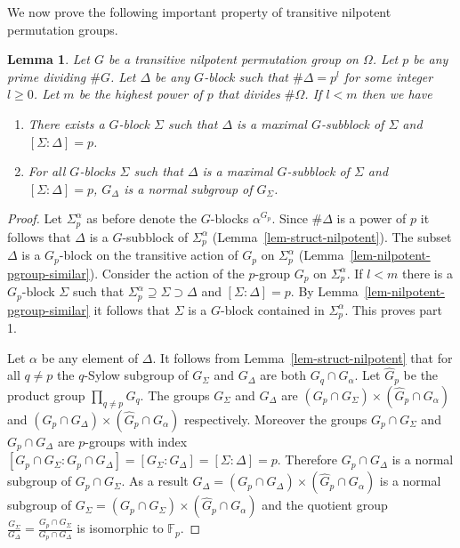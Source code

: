 \documentclass[11pt]{madras}%
\newtheorem{lemma}[theorem]{Lemma}
\theoremstyle{remark}
\begin{document}
 We now prove the following important property of transitive nilpotent
 permutation groups.

\begin{lemma}\label{lem-nilpotent-block-increment}
  Let $G$ be a transitive nilpotent permutation group on $\Omega$. Let
  $p$ be any prime dividing $\# G$. Let $\Delta$ be any $G$-block such
  that $\# \Delta = p^l$ for some integer $l \geq 0$. Let $m$ be the
  highest power of $p$ that divides $\# \Omega$. If $l < m$ then we
  have
  \begin{enumerate}
  \item There exists a $G$-block $\Sigma$ such that $\Delta$ is a
    maximal $G$-subblock of $\Sigma$ and $[\Sigma: \Delta] = p$.
  \item For all $G$-blocks $\Sigma$ such that $\Delta$ is a maximal
    $G$-subblock of $\Sigma$ and $[\Sigma: \Delta] = p$, $G_\Delta$ is
    a normal subgroup of $G_\Sigma$.
  \end{enumerate}
\end{lemma}
\begin{proof}
  Let $\Sigma_p^\alpha$ as before denote the $G$-blocks
  $\alpha^{G_p}$.  Since $\# \Delta$ is a power of $p$ it follows that
  $\Delta$ is a $G$-subblock of $\Sigma_p^\alpha$
  (Lemma~\ref{lem-struct-nilpotent}). The subset $\Delta$ is a
  $G_p$-block on the transitive action of $G_p$ on $\Sigma_p^\alpha$
  (Lemma~\ref{lem-nilpotent-pgroup-similar}).  Consider the action of
  the $p$-group $G_p$ on $\Sigma_p^\alpha$. If $l < m$ there is a
  $G_p$-block $\Sigma$ such that $\Sigma_p^\alpha \supseteq \Sigma
  \supset \Delta$ and $[\Sigma : \Delta] = p$. By
  Lemma~\ref{lem-nilpotent-pgroup-similar} it follows that $\Sigma$ is
  a $G$-block contained in $\Sigma_p^\alpha$. This proves part 1.

  Let $\alpha$ be any element of $\Delta$. It follows {from}
  Lemma~\ref{lem-struct-nilpotent} that for all $q \neq p$ the
  $q$-Sylow subgroup of $G_\Sigma$ and $G_\Delta$ are both $G_q \cap
  G_\alpha$. Let $\widehat{G}_p$ be the product group $\prod_{q \neq
    p} G_q$.  The groups $G_\Sigma$ and $G_\Delta$ are $(G_p \cap
  G_\Sigma) \times (\widehat{G}_p \cap G_\alpha)$ and $(G_p \cap
  G_\Delta) \times (\widehat{G}_p \cap G_\alpha)$ respectively.
  Moreover the groups $G_p \cap G_\Sigma$ and $G_p \cap G_\Delta$ are
  $p$-groups with index $[G_p \cap G_\Sigma : G_p \cap G_\Delta] =
  [G_\Sigma : G_\Delta] = [\Sigma : \Delta] = p$.  Therefore $G_p \cap
  G_\Delta$ is a normal subgroup of $G_p \cap G_\Sigma$. As a result
  $G_\Delta = (G_p \cap G_\Delta)\times (\widehat{G}_p \cap G_\alpha)$
  is a normal subgroup of $G_\Sigma = (G_p \cap G_\Sigma) \times
  (\widehat{G}_p \cap G_\alpha)$ and the quotient group
  $\frac{G_\Sigma}{G_\Delta} = \frac{G_p \cap G_\Sigma}{G_p \cap
    G_\Delta}$ is isomorphic to $\mathbb{F}_p$.
  
\end{proof}
\end{document}

